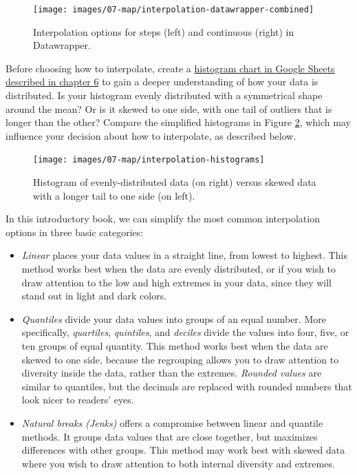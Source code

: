 \documentclass[
  english,
]{book}
\begin{document}
\begin{figure}
\texttt{[image: images/07-map/interpolation-datawrapper-combined]} \caption{Interpolation options for steps (left) and continuous (right) in Datawrapper.}\label{fig:interpolation-datawrapper-combined}
\end{figure}

Before choosing how to interpolate, create a \href{histogram-google.html}{histogram chart in Google Sheets described in chapter 6} to gain a deeper understanding of how your data is distributed. Is your histogram evenly distributed with a symmetrical shape around the mean? Or is it skewed to one side, with one tail of outliers that is longer than the other? Compare the simplified histograms in Figure \ref{fig:interpolation-histograms}, which may influence your decision about how to interpolate, as described below.



\begin{figure}
\texttt{[image: images/07-map/interpolation-histograms]} \caption{Histogram of evenly-distributed data (on right) versus skewed data with a longer tail to one side (on left).}\label{fig:interpolation-histograms}
\end{figure}

In this introductory book, we can simplify the most common interpolation options in three basic categories:

\begin{itemize}
\item
  \emph{Linear} places your data values in a straight line, from lowest to highest. This method works best when the data are evenly distributed, or if you wish to draw attention to the low and high extremes in your data, since they will stand out in light and dark colors.
\item
  \emph{Quantiles} divide your data values into groups of an equal number. More specifically, \emph{quartiles}, \emph{quintiles}, and \emph{deciles} divide the values into four, five, or ten groups of equal quantity. This method works best when the data are skewed to one side, because the regrouping allows you to draw attention to diversity inside the data, rather than the extremes. \emph{Rounded values} are similar to quantiles, but the decimals are replaced with rounded numbers that look nicer to readers' eyes.
\item
  \emph{Natural breaks (Jenks)} offers a compromise between linear and quantile methods. It groups data values that are close together, but maximizes differences with other groups. This method may work best with skewed data where you wish to draw attention to both internal diversity and extremes.
\end{itemize}
\end{document}

